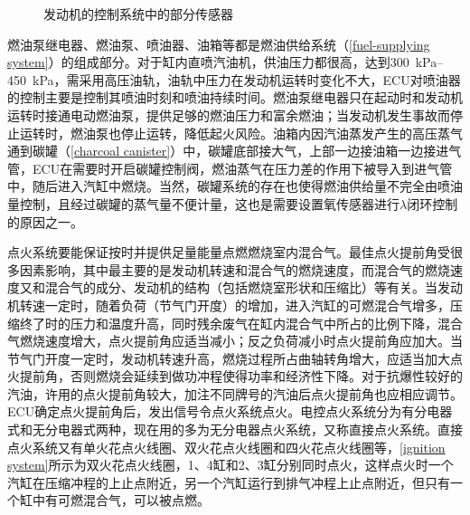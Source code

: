 \documentclass[UTF8]{ctexart}
\numberwithin{figure}{section}
\numberwithin{table}{section}
\begin{document}
\begin{figure}[htbp]
	\centering
	\caption{发动机的控制系统中的部分传感器}
	\label{sensors}
\end{figure}

燃油泵继电器、燃油泵、喷油器、油箱等都是燃油供给系统（\cref{fuel-supplying system}）的组成部分。对于缸内直喷汽油机，供油压力都很高，达到\qtyrange[range-phrase = $\,\sim\,$, range-units = single]{300}{450}{\kPa}，需采用高压油轨，油轨中压力在发动机运转时变化不大，ECU对喷油器的控制主要是控制其喷油时刻和喷油持续时间。燃油泵继电器只在起动时和发动机运转时接通电动燃油泵，提供足够的燃油压力和富余燃油；当发动机发生事故而停止运转时，燃油泵也停止运转，降低起火风险。油箱内因汽油蒸发产生的高压蒸气通到碳罐（\cref{charcoal canister}）中，碳罐底部接大气，上部一边接油箱一边接进气管，ECU在需要时开启碳罐控制阀，燃油蒸气在压力差的作用下被导入到进气管中，随后进入汽缸中燃烧。当然，碳罐系统的存在也使得燃油供给量不完全由喷油量控制，且经过碳罐的蒸气量不便计量，这也是需要设置氧传感器进行$\lambda$闭环控制的原因之一。

点火系统要能保证按时并提供足量能量点燃燃烧室内混合气。最佳点火提前角受很多因素影响，其中最主要的是发动机转速和混合气的燃烧速度，而混合气的燃烧速度又和混合气的成分、发动机的结构（包括燃烧室形状和压缩比）等有关。当发动机转速一定时，随着负荷（节气门开度）的增加，进入汽缸的可燃混合气增多，压缩终了时的压力和温度升高，同时残余废气在缸内混合气中所占的比例下降，混合气燃烧速度增大，点火提前角应适当减小；反之负荷减小时点火提前角应加大。当节气门开度一定时，发动机转速升高，燃烧过程所占曲轴转角增大，应适当加大点火提前角，否则燃烧会延续到做功冲程使得功率和经济性下降。对于抗爆性较好的汽油，许用的点火提前角较大，加注不同牌号的汽油后点火提前角也应相应调节。ECU确定点火提前角后，发出信号令点火系统点火。电控点火系统分为有分电器式和无分电器式两种，现在用的多为无分电器点火系统，又称直接点火系统。直接点火系统又有单火花点火线圈、双火花点火线圈和四火花点火线圈等，\cref{ignition system}所示为双火花点火线圈，1、4缸和2、3缸分别同时点火，这样点火时一个汽缸在压缩冲程的上止点附近，另一个汽缸运行到排气冲程上止点附近，但只有一个缸中有可燃混合气，可以被点燃。
\end{document}
